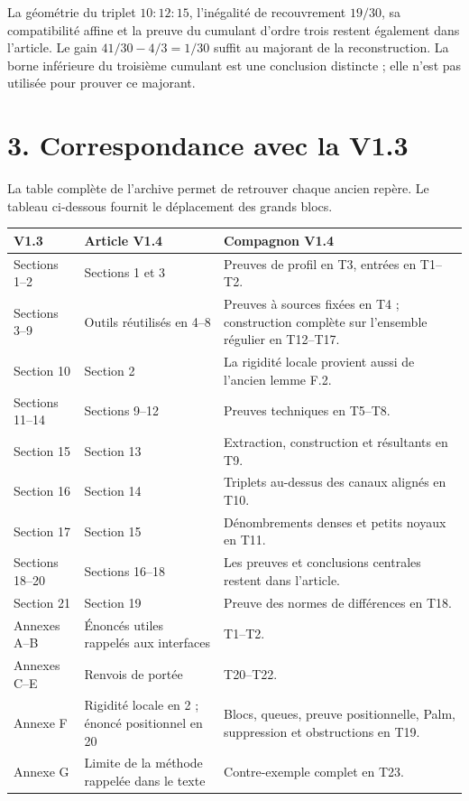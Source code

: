 \documentclass[11pt,a4paper]{article}
\begin{document}
La géométrie du triplet \(10:12:15\), l'inégalité de recouvrement
\(19/30\), sa compatibilité affine et la preuve du cumulant d'ordre trois
restent également dans l'article. Le gain
\(41/30-4/3=1/30\) suffit au majorant de la reconstruction.
La borne inférieure du troisième cumulant est une conclusion distincte ;
elle n'est pas utilisée pour prouver ce majorant.

\clearpage
\section*{3. Correspondance avec la V1.3}
La table complète de l'archive permet de retrouver chaque ancien repère.
Le tableau ci-dessous fournit le déplacement des grands blocs.

\small
\begin{tabularx}{\textwidth}{@{}>{\raggedright\arraybackslash}p{}>{\raggedright\arraybackslash}p{}>{\raggedright\arraybackslash}X@{}}
\toprule
V1.3 & Article V1.4 & Compagnon V1.4\\
\midrule
Sections 1--2 & Sections 1 et 3 & Preuves de profil en T3, entrées en T1--T2.\\[4pt]
Sections 3--9 & Outils réutilisés en 4--8 & Preuves à sources fixées en T4 ; construction complète sur l'ensemble régulier en T12--T17.\\[4pt]
Section 10 & Section 2 & La rigidité locale provient aussi de l'ancien lemme F.2.\\[4pt]
Sections 11--14 & Sections 9--12 & Preuves techniques en T5--T8.\\[4pt]
Section 15 & Section 13 & Extraction, construction et résultants en T9.\\[4pt]
Section 16 & Section 14 & Triplets au-dessus des canaux alignés en T10.\\[4pt]
Section 17 & Section 15 & Dénombrements denses et petits noyaux en T11.\\[4pt]
Sections 18--20 & Sections 16--18 & Les preuves et conclusions centrales restent dans l'article.\\[4pt]
Section 21 & Section 19 & Preuve des normes de différences en T18.\\[4pt]
Annexes A--B & Énoncés utiles rappelés aux interfaces & T1--T2.\\[4pt]
Annexes C--E & Renvois de portée & T20--T22.\\[4pt]
Annexe F & Rigidité locale en 2 ; énoncé positionnel en 20 & Blocs, queues, preuve positionnelle, Palm, suppression et obstructions en T19.\\[4pt]
Annexe G & Limite de la méthode rappelée dans le texte & Contre-exemple complet en T23.\\
\bottomrule
\end{tabularx}
\normalsize
\end{document}
